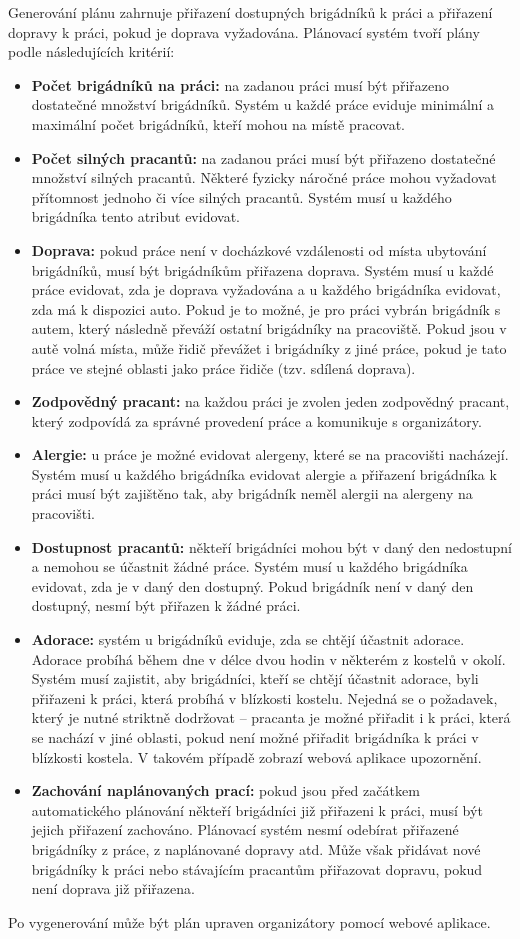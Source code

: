 Generování plánu zahrnuje přiřazení dostupných brigádníků k práci a přiřazení dopravy k práci, pokud je doprava vyžadována.
Plánovací systém tvoří plány podle následujících kritérií:
\begin{itemize}
    \item \textbf{Počet brigádníků na práci:} na zadanou práci musí být přiřazeno dostatečné množství brigádníků. Systém u každé práce eviduje minimální a maximální počet brigádníků, kteří mohou na místě pracovat. 
    \item \textbf{Počet silných pracantů:} na zadanou práci musí být přiřazeno dostatečné množství silných pracantů. Některé fyzicky náročné práce mohou vyžadovat přítomnost jednoho či více silných pracantů. Systém musí u každého brigádníka tento atribut evidovat.
    \item \textbf{Doprava:} pokud práce není v docházkové vzdálenosti od místa ubytování brigádníků, musí být brigádníkům přiřazena doprava. Systém musí u každé práce evidovat, zda je doprava vyžadována a u každého brigádníka evidovat, zda má k dispozici auto. Pokud je to možné, je pro práci vybrán brigádník s autem, který následně převáží ostatní brigádníky na pracoviště. Pokud jsou v autě volná místa, může řidič převážet i brigádníky z jiné práce, pokud je tato práce ve stejné oblasti jako práce řidiče (tzv. sdílená doprava).
    \item \textbf{Zodpovědný pracant:} na každou práci je zvolen jeden zodpovědný pracant, který zodpovídá za správné provedení práce a komunikuje s organizátory.
    \item \textbf{Alergie:} u práce je možné evidovat alergeny, které se na pracovišti nacházejí. Systém musí u každého brigádníka evidovat alergie a přiřazení brigádníka k práci musí být zajištěno tak, aby brigádník neměl alergii na alergeny na pracovišti.
    \item \textbf{Dostupnost pracantů:} někteří brigádníci mohou být v daný den nedostupní a nemohou se účastnit žádné práce. Systém musí u každého brigádníka evidovat, zda je v daný den dostupný. Pokud brigádník není v daný den dostupný, nesmí být přiřazen k žádné práci.
    \item \textbf{Adorace:} systém u brigádníků eviduje, zda se chtějí účastnit adorace. Adorace probíhá během dne v délce dvou hodin v některém z kostelů v okolí. Systém musí zajistit, aby brigádníci, kteří se chtějí účastnit adorace, byli přiřazeni k práci, která probíhá v blízkosti kostelu. Nejedná se o požadavek, který je nutné striktně dodržovat -- pracanta je možné přiřadit i k práci, která se nachází v jiné oblasti, pokud není možné přiřadit brigádníka k práci v blízkosti kostela. V takovém případě zobrazí webová aplikace upozornění.
    \item \textbf{Zachování naplánovaných prací:} pokud jsou před začátkem automatického plánování někteří brigádníci již přiřazeni k práci, musí být jejich přiřazení zachováno. Plánovací systém nesmí odebírat přiřazené brigádníky z práce, z naplánované dopravy atd. Může však přidávat nové brigádníky k práci nebo stávajícím pracantům přiřazovat dopravu, pokud není doprava již přiřazena.
\end{itemize}

Po vygenerování může být plán upraven organizátory pomocí webové aplikace. 